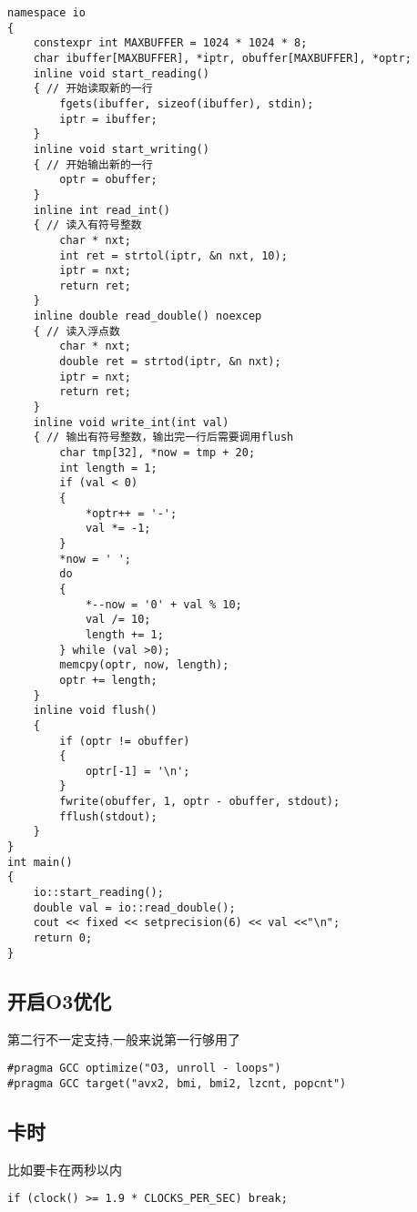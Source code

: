 \documentclass[a4paper, fontset=none]{ctexart}
\begin{document}
\begin{verbatim}
namespace io
{
    constexpr int MAXBUFFER = 1024 * 1024 * 8;
    char ibuffer[MAXBUFFER], *iptr, obuffer[MAXBUFFER], *optr;
    inline void start_reading()
    { // 开始读取新的一行
        fgets(ibuffer, sizeof(ibuffer), stdin);
        iptr = ibuffer;
    }
    inline void start_writing()
    { // 开始输出新的一行
        optr = obuffer;
    }
    inline int read_int()
    { // 读入有符号整数
        char * nxt;
        int ret = strtol(iptr, &n nxt, 10);
        iptr = nxt;
        return ret;
    }
    inline double read_double() noexcep
    { // 读入浮点数
        char * nxt;
        double ret = strtod(iptr, &n nxt);
        iptr = nxt;
        return ret;
    }
    inline void write_int(int val)
    { // 输出有符号整数，输出完一行后需要调用flush
        char tmp[32], *now = tmp + 20;
        int length = 1;
        if (val < 0)
        {
            *optr++ = '-';
            val *= -1;
        }
        *now = ' ';
        do
        {
            *--now = '0' + val % 10;
            val /= 10;
            length += 1;
        } while (val >0);
        memcpy(optr, now, length);
        optr += length;
    }
    inline void flush()
    {
        if (optr != obuffer)
        {
            optr[-1] = '\n';
        }
        fwrite(obuffer, 1, optr - obuffer, stdout);
        fflush(stdout);
    }
}
int main()
{
    io::start_reading();
    double val = io::read_double();
    cout << fixed << setprecision(6) << val <<"\n";
    return 0;
}
\end{verbatim}
\subsection{开启O3优化}
第二行不一定支持,一般来说第一行够用了
\begin{verbatim}
#pragma GCC optimize("O3, unroll - loops")
#pragma GCC target("avx2, bmi, bmi2, lzcnt, popcnt")
\end{verbatim}
\subsection{卡时}
比如要卡在两秒以内

\begin{verbatim}
if (clock() >= 1.9 * CLOCKS_PER_SEC) break;
\end{verbatim}
\end{document}
